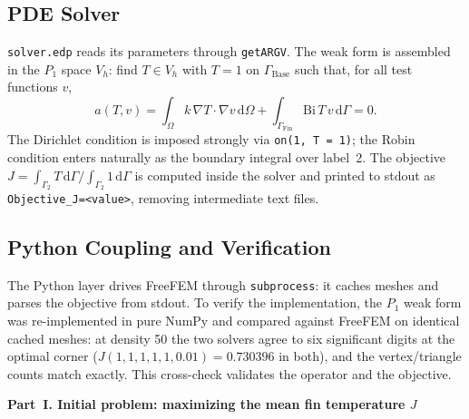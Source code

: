 \documentclass[11pt,a4paper]{article}
\newcommand{\partbar}[1]{%
  \bigskip
  \begin{center}\large\bfseries #1\end{center}
  \medskip
}
\begin{document}
\subsection{PDE Solver}
\texttt{solver.edp} reads its parameters through \texttt{getARGV}. The weak form is assembled in the
$P_1$ space $V_h$: find $T\in V_h$ with $T=1$ on $\Gamma_{\text{Base}}$ such that, for all test
functions $v$,
\begin{equation}
a(T,v)=\int_\Omega k\,\nabla T\cdot\nabla v\,\mathrm{d}\Omega
+\int_{\Gamma_{\text{Fin}}}\mathrm{Bi}\,T\,v\,\mathrm{d}\Gamma=0.
\end{equation}
The Dirichlet condition is imposed strongly via \texttt{on(1, T = 1)}; the Robin condition enters
naturally as the boundary integral over label~2. The objective
$J=\int_{\Gamma_2}T\,\mathrm{d}\Gamma/\int_{\Gamma_2}1\,\mathrm{d}\Gamma$ is computed inside the
solver and printed to stdout as \texttt{Objective\_J=<value>}, removing intermediate text files.

\subsection{Python Coupling and Verification}
The Python layer drives FreeFEM through \texttt{subprocess}: it caches meshes and parses the
objective from stdout. To verify the implementation, the $P_1$ weak form was re-implemented in pure
NumPy and compared against FreeFEM on identical cached meshes: at density 50 the two solvers agree to
six significant digits at the optimal corner ($J(1,1,1,1,1,0.01)=0.730396$ in both), and the
vertex/triangle counts match exactly. This cross-check validates the operator and the objective.

\partbar{Part~I. Initial problem: maximizing the mean fin temperature $J$}
\end{document}
